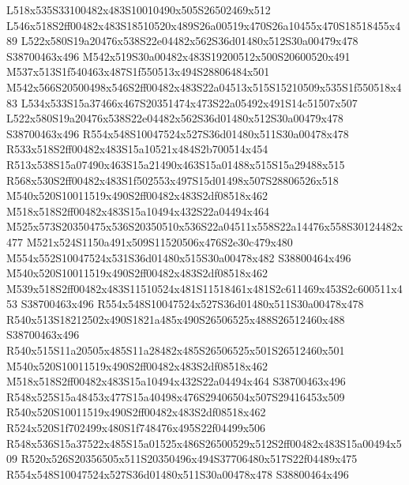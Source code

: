 \documentclass{article}
\begin{document}
\begin{multicols}{2}








L518x535S33100482x483S10010490x505S26502469x512 L546x518S2ff00482x483S18510520x489S26a00519x470S26a10455x470S18518455x489 L522x580S19a20476x538S22e04482x562S36d01480x512S30a00479x478 S38700463x496 M542x519S30a00482x483S19200512x500S20600520x491 M537x513S1f540463x487S1f550513x494S28806484x501 M542x566S20500498x546S2ff00482x483S22a04513x515S15210509x535S1f550518x483 L534x533S15a37466x467S20351474x473S22a05492x491S14c51507x507 L522x580S19a20476x538S22e04482x562S36d01480x512S30a00479x478 S38700463x496 R554x548S10047524x527S36d01480x511S30a00478x478 R533x518S2ff00482x483S15a10521x484S2b700514x454 R513x538S15a07490x463S15a21490x463S15a01488x515S15a29488x515 R568x530S2ff00482x483S1f502553x497S15d01498x507S28806526x518 M540x520S10011519x490S2ff00482x483S2df08518x462 M518x518S2ff00482x483S15a10494x432S22a04494x464 M525x573S20350475x536S20350510x536S22a04511x558S22a14476x558S30124482x477 M521x524S1150a491x509S11520506x476S2e30c479x480 M554x552S10047524x531S36d01480x515S30a00478x482 S38800464x496 M540x520S10011519x490S2ff00482x483S2df08518x462 M539x518S2ff00482x483S11510524x481S11518461x481S2c611469x453S2c600511x453 S38700463x496 R554x548S10047524x527S36d01480x511S30a00478x478 R540x513S18212502x490S1821a485x490S26506525x488S26512460x488 S38700463x496 R540x515S11a20505x485S11a28482x485S26506525x501S26512460x501 M540x520S10011519x490S2ff00482x483S2df08518x462 M518x518S2ff00482x483S15a10494x432S22a04494x464 S38700463x496 R548x525S15a48453x477S15a40498x476S29406504x507S29416453x509 R540x520S10011519x490S2ff00482x483S2df08518x462 R524x520S1f702499x480S1f748476x495S22f04499x506 R548x536S15a37522x485S15a01525x486S26500529x512S2ff00482x483S15a00494x509 R520x526S20356505x511S20350496x494S37706480x517S22f04489x475 R554x548S10047524x527S36d01480x511S30a00478x478 S38800464x496


\end{multicols}
\end{document}
